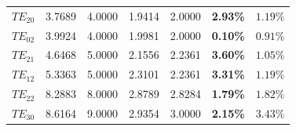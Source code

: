 \documentclass[VANCOUVER]{USG}
\begin{document}
\begin{table}[!t]
{\begin{tabular}{ccccccc}
            $TE_{20}$                                                                        & 3.7689                                                    & 4.0000                                                    & 1.9414                                                 & 2.0000                                                 & \textbf{2.93\%}                                 & $1.19\%$                                      \\
            $TE_{02}$                                                                        & 3.9924                                                    & 4.0000                                                    & 1.9981                                                 & 2.0000                                                 & \textbf{0.10\%}                                 & $0.91\%$                                      \\
            $TE_{21}$                                                                        & 4.6468                                                    & 5.0000                                                    & 2.1556                                                 & 2.2361                                                 & \textbf{3.60\%}                                 & $1.05\%$                                      \\
            $TE_{12}$                                                                        & 5.3363                                                    & 5.0000                                                    & 2.3101                                                 & 2.2361                                                 & \textbf{3.31\%}                                 & $1.19\%$                                      \\
            $TE_{22}$                                                                        & 8.2883                                                    & 8.0000                                                    & 2.8789                                                 & 2.8284                                                 & \textbf{1.79\%}                                 & $1.82\%$                                      \\
            $TE_{30}$                                                                        & 8.6164                                                    & 9.0000                                                    & 2.9354                                                 & 3.0000                                                 & \textbf{2.15\%}                                 & $3.43\%$                                      \\

\end{tabular}}
\end{table}
\end{document}
